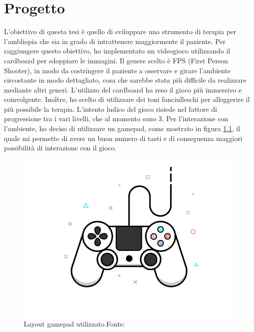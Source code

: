 \documentclass[
a4paper,
cleardoublepage=empty,
headings=twolinechapter,
numbers=autoenddot,
]{scrbook}
\begin{document}
    \chapter{Progetto}
     L'obiettivo di questa tesi è quello di sviluppare uno strumento di terapia per l'ambliopia che sia in grado di intrattenere maggiormente il paziente. Per raggiungere questo obiettivo, ho implementato un videogioco utilizzando il cardboard per sdoppiare le immagini. Il genere scelto è FPS (First Person Shooter), in modo da costringere il paziente a osservare e girare l'ambiente circostante in modo dettagliato, cosa che sarebbe stata più difficile da realizzare mediante altri generi. L'utilizzo del cardboard ha reso il gioco più immersivo e coinvolgente. Inoltre, ho scelto di utilizzare dei toni fanciulleschi per alleggerire il più possibile la terapia. L'intento ludico del gioco risiede nel fattore di progressione tra i vari livelli, che al momento sono 3. Per l'interazione con l'ambiente, ho deciso di utilizzare un gamepad, come mostrato in figura \ref{fig:gamepad}, il quale mi permette di avere un buon numero di tasti e di conseguenza maggiori possibilità di interazione con il gioco.
     \begin{figure}[H]
    	\centering
    	\includegraphics[width=0.8\linewidth]{image/gamepad}
    	\caption{Layout gamepad utilizzato.Fonte:\cite{controller_image}}
    	\label{fig:gamepad}
    \end{figure}
\end{document}
